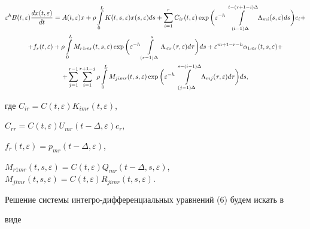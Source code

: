 \begin{gather} 


\varepsilon^h B(t,\varepsilon)\frac{dx(t,\varepsilon)}{dt} 


=A(t,\varepsilon)x+\rho\int\limits^L_0 K(t,s,\varepsilon) 


x(s,\varepsilon)ds+\sum^r_{i=1}C_{ir}(t,\varepsilon)\exp\bigg( 


\varepsilon^{-h}\int\limits^{t-(r+1-i)\Delta}_{(i-1)\Delta} 


\Lambda_{mi}(s,\varepsilon)ds\bigg)c_i +\notag \\ 


% 


+f_r(t,\varepsilon)+\rho\int\limits^L_0 M_{r1mr} 


(t,s,\varepsilon)\exp\bigg(\varepsilon^{-h} 


\int\limits^s_{(r-1)\Delta}\Lambda_{mr}(\tau,\varepsilon) 


d\tau\bigg)ds+\varepsilon^{m+1-r-h}\alpha_{1mr} 


(t,s,\varepsilon)+ \notag \\ 


% 


+\sum^{r-1}_{j=1}\sum^{r+1-j}_{i=1}\rho 


\int\limits^L_0 M_{jimr}(t,s,\varepsilon)\exp\bigg( 


\varepsilon^{-h}\int\limits^{s-(i-1)\Delta}_{(j-1)\Delta} 


\Lambda_{mj}(\tau,\varepsilon)d\tau\bigg)ds, 


\end{gather} 


где $C_{ir}=C(t,\varepsilon)K_{imr}(t,\varepsilon)$, 


$C_{rr}=C(t,\varepsilon)U_{mr}(t-\Delta,\varepsilon)c_r$, 


$f_r(t,\varepsilon)=p_{mr}(t-\Delta,\varepsilon)$, 


$M_{r1mr}(t,s,\varepsilon)=C(t,\varepsilon) 


Q_{mr}(t-\Delta,s,\varepsilon)$, $M_{jimr}(t,s,\varepsilon)= 


C(t,\varepsilon)R_{jimr}(t,s,\varepsilon)$. 


 


Решение системы интегро-дифференциальных уравнений (6) будем искать в 


виде 


